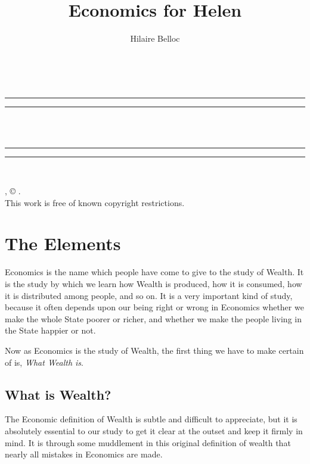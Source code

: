 \documentclass{book}
\date{}
\title{Economics for Helen}
\author{Hilaire Belloc}
\begin{document}
\thispagestyle{empty}
\begin{center}
	{\Huge \@title   \\[5mm]}
\end{center}
\newpage
\thispagestyle{empty}
\cleardoublepage
\begin{center}
	\thispagestyle{empty}
	\vspace*{\baselineskip}
	\rule{\textwidth}{1.6pt}\vspace*{-\baselineskip}\vspace*{2pt}
	\rule{\textwidth}{0.4pt}\\[\baselineskip]
	{\Huge\scshape \@title   \\[5mm]}
	{\Large }
	\rule{\textwidth}{0.4pt}\vspace*{-\baselineskip}\vspace{3.2pt}
	\rule{\textwidth}{1.6pt}\\[\baselineskip]
	\vspace*{4\baselineskip}
	{\Large \@author}
	\vfill
\end{center}
\pagebreak
\newpage
\thispagestyle{empty}
\null\vfill
\noindent
\begin{center}
	{\emph{\@title}, © \@author.\\[5mm]}
	{This work is free of known copyright restrictions.\\[5mm]}
\end{center}
\pagebreak
\newpage
\setcounter{tocdepth}{0}
\setcounter{secnumdepth}{0}
\setcounter{chapter}{0}

\part{The Elements}
\label{chapter-0}
Economics is the name which people have come to give to the study of Wealth. It is the study by which we learn how Wealth is produced, how it is consumed, how it is distributed among people, and so on. It is a very important kind of study, because it often depends upon our being right or wrong in Economics whether we make the whole State poorer or richer, and whether we make the people living in the State happier or not.

Now as Economics is the study of Wealth, the first thing we have to make certain of is, \emph{What Wealth is}.

\chapter{What is Wealth?}
\label{chapter-1}
The Economic definition of Wealth is subtle and difficult to appreciate, but it is absolutely essential to our study to get it clear at the outset and keep it firmly in mind. It is through some muddlement in this original definition of wealth that nearly all mistakes in Economics are made.
\end{document}
